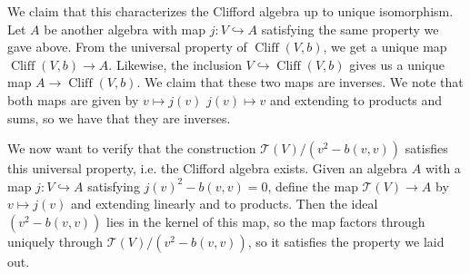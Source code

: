 \documentclass[psamsfonts]{amsart}
\theoremstyle{definition}
\theoremstyle{remark}
\DeclareMathOperator{\Cliff}{Cliff}
\begin{document}
We claim that this characterizes the Clifford algebra up to unique isomorphism. Let $A$ be another algebra with map $j: V\hookrightarrow A$ satisfying the same property we gave above. From the universal property of $\Cliff(V,b)$, we get a unique map $\Cliff(V,b) \to A$. Likewise, the inclusion $V \hookrightarrow \Cliff(V,b)$ gives us a unique map $A \to \Cliff(V,b)$. We claim that these two maps are inverses. We note that both maps are given by $v \mapsto j(v)$ $j(v) \mapsto v$ and extending to products and sums, so we have that they are inverses.

We now want to verify that the construction $\mathcal{T}(V) / (v^2 - b(v,v))$ satisfies this universal property, i.e. the Clifford algebra exists. Given an algebra $A$ with a map $j : V \hookrightarrow A$ satisfying $j(v)^2 - b(v,v) = 0$, define the map $\mathcal{T}(V) \to A$ by $v \mapsto j(v)$ and extending linearly and to products. Then the ideal $(v^2 - b(v,v))$ lies in the kernel of this map, so the map factors through uniquely through $\mathcal{T}(V) / (v^2 - b(v,v))$, so it satisfies the property we laid out.
%
\setcounter{section}{5}
%
\setcounter{thm}{0}
%
\end{document}
